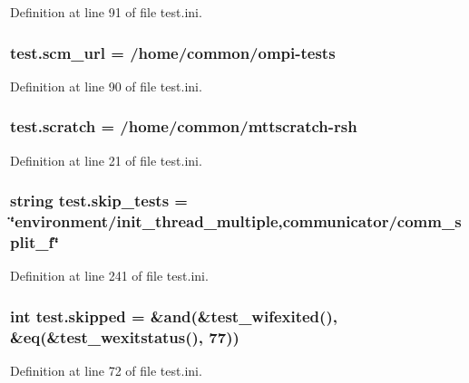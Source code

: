 Definition at line 91 of file test.\-ini.

\hypertarget{namespacetest_a6eab9a211bdeacabe249075b1612c3d9}{
\subsubsection[{scm\-\_\-url}]{\setlength{\rightskip}{0pt plus 5cm}test.\-scm\-\_\-url = /home/common/ompi-\/tests}}\label{namespacetest_a6eab9a211bdeacabe249075b1612c3d9}


Definition at line 90 of file test.\-ini.

\hypertarget{namespacetest_aab6125cbc3654cbeb0f5df11bf28b3f1}{
\subsubsection[{scratch}]{\setlength{\rightskip}{0pt plus 5cm}test.\-scratch = /home/common/mttscratch-\/rsh}}\label{namespacetest_aab6125cbc3654cbeb0f5df11bf28b3f1}


Definition at line 21 of file test.\-ini.

\hypertarget{namespacetest_a92bc9c8909f4ebfd33da729397fa6669}{
\subsubsection[{skip\-\_\-tests}]{\setlength{\rightskip}{0pt plus 5cm}string test.\-skip\-\_\-tests = \char`\"{}environment/init\-\_\-thread\-\_\-multiple,communicator/comm\-\_\-split\-\_\-f\char`\"{}}}\label{namespacetest_a92bc9c8909f4ebfd33da729397fa6669}


Definition at line 241 of file test.\-ini.

\hypertarget{namespacetest_a7a09931cf523b8af2e201bee605f000c}{
\subsubsection[{skipped}]{\setlength{\rightskip}{0pt plus 5cm}int test.\-skipped = \&and(\&test\-\_\-wifexited(), \&eq(\&test\-\_\-wexitstatus(), 77))}}\label{namespacetest_a7a09931cf523b8af2e201bee605f000c}


Definition at line 72 of file test.\-ini.

